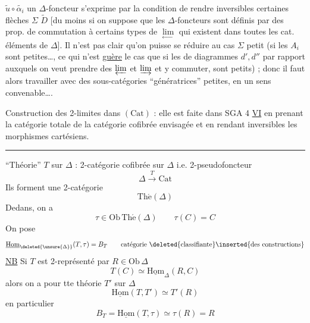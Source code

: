 $\widetilde u\circ\widetilde{\alpha_i}$ un $\Delta$-foncteur s'exprime par la condition de rendre inversibles certaines flèches $\Sigma$  $\widetilde D$ [du moins si on suppose que les $\Delta$-foncteurs sont définis par des prop. de commutation à certains types de $\underset{\leftrightarrow}{\lim}$ qui existent dans toutes les cat. éléments de $\Delta$]. Il n'est pas clair qu'on puisse se réduire au cas $\Sigma$ petit (si les $A_i$  sont petites\ldots, ce qui n'est \uline{guère} le cas que si les  de diagrammes $d',d''$ par rapport auxquels on veut prendre des $\varprojlim$ et $\varinjlim$ et y commuter, sont petits) ; donc il faut alors travailler avec des sous-catégories ``génératrices'' petites, en un sens convenable\ldots.

Construction des 2-limites dans $(\mathrm{Cat})$ : elle est faite dans SGA 4 \uline{VI} en prenant la catégorie totale de la catégorie cofibrée envisagée et en rendant inversibles les morphismes cartésiens.

\medskip\hrule\medskip

``Théorie'' $T$ sur $\Delta$ : 2-catégorie cofibrée sur $\Delta$ i.e. 2-pseudofoncteur
\[
\Delta\xrightarrow{T}\mathrm{Cat}
\]
Ils forment une 2-catégorie
\[
\mathrm{Th\acute e}(\Delta)
\]
Dedans, on a
\[
\tau\in\mathrm{Ob}\,\mathrm{Th\acute e}(\Delta)\qquad \tau(C)=C
\]
On pose
\[
\underline{\mathrm{Hom}}_{\deleted{\unsure{\Delta}}}(T,\tau)=B_T\qquad
\text{catégorie \deleted{classifiante}\inserted{des constructions}}
\]
\uline{NB} Si $T$ est 2-représenté par $R\in\mathrm{Ob}\,\Delta$
\[
T(C)\simeq\underline{\mathrm{Hom}}_{\Delta}(R,C)
\]
alors on a  pour tte théorie $T'$ sur $\Delta$
\[
\underline{\mathrm{Hom}}(T,T')\simeq T'(R)
\]
en particulier
\[
B_T=\underline{\mathrm{Hom}}(T,\tau)\simeq\tau(R)=R
\]
